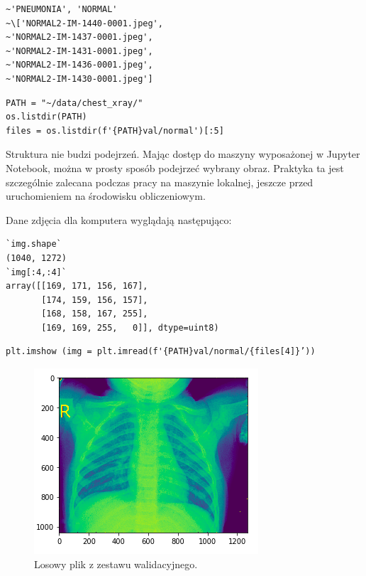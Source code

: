\documentclass[12pt,a4paper,twoside,titlepage,openright]{book}
\begin{document}
\noindent
\begin{minipage}{\linewidth}
\begin{lstlisting}[caption=Podgląd danych, label=lst:test]
~'PNEUMONIA', 'NORMAL'
~\['NORMAL2-IM-1440-0001.jpeg',
~'NORMAL2-IM-1437-0001.jpeg',
~'NORMAL2-IM-1431-0001.jpeg',
~'NORMAL2-IM-1436-0001.jpeg',
~'NORMAL2-IM-1430-0001.jpeg']
\end{lstlisting}
\end{minipage}

\noindent
\begin{minipage}{\linewidth}
\begin{lstlisting}[caption=Wyświetlenie struktury danych, label=lst:test]
PATH = "~/data/chest_xray/"
os.listdir(PATH)
files = os.listdir(f'{PATH}val/normal')[:5]
\end{lstlisting}
\end{minipage}

Struktura nie budzi podejrzeń. Mając dostęp do maszyny wyposażonej w Jupyter Notebook, można w prosty sposób podejrzeć wybrany obraz. Praktyka ta jest szczególnie zalecana podczas pracy na maszynie lokalnej, jeszcze przed uruchomieniem na środowisku obliczeniowym.

Dane zdjęcia dla komputera wyglądają następująco:

\noindent
\begin{minipage}{\linewidth}
\begin{lstlisting}[caption=Struktura obrazu w formie macierzy, label=lst:test]
`img.shape`
(1040, 1272)
`img[:4,:4]`
array([[169, 171, 156, 167],
       [174, 159, 156, 157],
       [168, 158, 167, 255],
       [169, 169, 255,   0]], dtype=uint8)
\end{lstlisting}
\end{minipage}

\noindent
\begin{minipage}{\linewidth}
\begin{lstlisting}[caption=Wyświetlenie obrazu w środowisku graficznym, label=lst:test]
plt.imshow (img = plt.imread(f'{PATH}val/normal/{files[4]}’))
\end{lstlisting}
\end{minipage}

\begin{figure}[ht]
	\centering
			\includegraphics[resolution=100, scale=0.7]{ExampleLungImage.png}
		\caption{Losowy plik z zestawu walidacyjnego.}
\end{figure}
\end{document}
